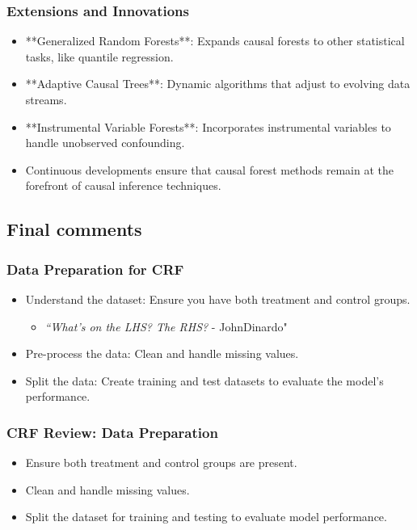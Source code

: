 \documentclass{beamer}
\begin{document}
\begin{frame}
\frametitle{Extensions and Innovations}
\begin{itemize}
    \item **Generalized Random Forests**: Expands causal forests to other statistical tasks, like quantile regression.
    \item **Adaptive Causal Trees**: Dynamic algorithms that adjust to evolving data streams.
    \item **Instrumental Variable Forests**: Incorporates instrumental variables to handle unobserved confounding.
    \item Continuous developments ensure that causal forest methods remain at the forefront of causal inference techniques.
\end{itemize}
\end{frame}






\subsection{Final comments}

\begin{frame}
\frametitle{Data Preparation for CRF}
\begin{itemize}
    \item Understand the dataset: Ensure you have both treatment and control groups. 
    	\begin{itemize} 
	\item \emph{``What's on the LHS? The RHS?} - JohnDinardo"
	\end{itemize}
    \item Pre-process the data: Clean and handle missing values.
    \item Split the data: Create training and test datasets to evaluate the model's performance.
\end{itemize}
\end{frame}

\begin{frame}
\frametitle{CRF Review: Data Preparation}
\begin{itemize}
    \item Ensure both treatment and control groups are present.
    \item Clean and handle missing values.
    \item Split the dataset for training and testing to evaluate model performance.
\end{itemize}
\end{frame}
\end{document}
